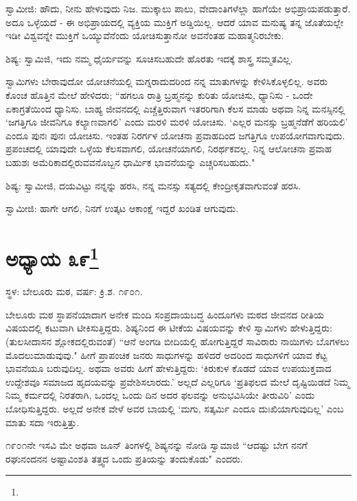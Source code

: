 ಸ್ವಾಮೀಜಿ: ಹೌದು, ನೀನು ಹೇಳುವುದು ನಿಜ. ಮುಕ್ಕಾಲು ಪಾಲು, ವೇದಾಂತಿಗಳೆಲ್ಲಾ ಹಾಗೆಯೇ ಅಭಿಪ್ರಾಯಪಡುತ್ತಾರೆ. ಅದೂ ಒಳ್ಳೆಯದೆ - ಈ ಅಭಿಪ್ರಾಯದಲ್ಲಿ ವ್ಯಕ್ತಿಯ ಮುಕ್ತಿಗೆ ಅಡ್ಡಿಯಿಲ್ಲ. ಆದರೆ ಯಾವ ಮನುಷ್ಯ ತನ್ನ ಜೊತೆಯಲ್ಲೇ ಇಡೀ ವಿಶ್ವವನ್ನೇ ಮುಕ್ತಿಗೆ ಒಯ್ಯುವೆನೆಂದು ಯೋಚಿಸುತ್ತಾನೋ ಅವನೆಂತಹ ಮಹಾತ್ಮನಿರಬೇಕು.

ಶಿಷ್ಯ: ಸ್ವಾಮಿಜಿ, ಇದು ನಮ್ಮ ಧೈರ್ಯವನ್ನು ಸೂಚಿಸಬಹುದೇ ಹೊರತು ಇದಕ್ಕೆ ಶಾಸ್ತ್ರ ಸಮ್ಮತವಿಲ್ಲ.

ಸ್ವಾಮಿಗಳು ಬೇರಾವುದೋ ಯೋಚನೆಯಲ್ಲಿ ಮಗ್ನರಾದುದರಿಂದ ನನ್ನ ಮಾತುಗಳನ್ನು ಕೇಳಿಸಿಕೊಳ್ಳಲಿಲ್ಲ. ಅವರು ಕೊಂಚ ಹೊತ್ತಿನ ಮೇಲೆ ಹೇಳಿದರು; “ಹಗಲೂ ರಾತ್ರಿ ಬ್ರಹ್ಮನನ್ನು ಕುರಿತು ಯೋಚಿಸು, ಧ್ಯಾನಿಸು - ಒಂದೇ ಏಕಾಗ್ರತೆಯಿಂದ ಧ್ಯಾನಿಸು. ಬಾಹ್ಯ ಜೀವನದಲ್ಲಿ ಎಚ್ಚೆತ್ತಿರುವಾಗ ಇತರರಿಗಾಗಿ ಕೆಲಸ ಮಾಡು ಅಥವಾ ನಿನ್ನ ಮನಸ್ಸಿನಲ್ಲಿ ‘ಜಗತ್ತಿಗೂ ಜೀವನಿಗೂ ಕಲ್ಯಾಣವಾಗಲಿ’ ಎಂದು ಮರಳಿ ಮರಳಿ ಯೋಚಿಸು. ‘ಎಲ್ಲರ ಮನಸ್ಸು ಬ್ರಹ್ಮನೆಡೆಗೆ ಹರಿಯಲಿ’ ಎಂದೂ ಪುನಃ ಪುನಃ ಯೋಚಿಸು. ಇಂತಹ ನಿರರ್ಗಳ ಯೋಚನಾ ಪ್ರವಾಹದಿಂದ ಜಗತ್ತಿಗೂ ಉಪಯೋಗವಾಗುವುದು. ಪ್ರಪಂಚದಲ್ಲಿ ಯಾವುದೇ ಒಳ್ಳೆಯ ಕೆಲಸವಾಗಲಿ, ಯೋಚನೆಯಾಗಲಿ, ನಿರರ್ಥಕವಲ್ಲ. ನಿನ್ನ ಆಲೋಚನಾ ಪ್ರವಾಹ ಬಹುಶಃ ಅಮೆರಿಕಾದಲ್ಲಿರುವವನೊಬ್ಬನ ಧಾರ್ಮಿಕ ಭಾವನೆಯನ್ನು ಎಚ್ಚರಿಸಬಹುದು."

ಶಿಷ್ಯ: ಸ್ವಾಮೀಜಿ, ದಯವಿಟ್ಟು ನನ್ನನ್ನು ಹರಸಿ, ನನ್ನ ಮನಸ್ಸು ಸತ್ಯದಲ್ಲಿ ಕೇಂದ್ರೀಕೃತವಾಗುವಂತೆ ಹರಸಿ.

ಸ್ವಾಮೀಜಿ: ಹಾಗೇ ಆಗಲಿ, ನಿನಗೆ ಉತ್ಕಟ ಆಕಾಂಕ್ಷೆ ಇದ್ದರೆ ಖಂಡಿತ ಆಗುವುದು.

\newpage

\chapter[ಅಧ್ಯಾಯ ೩೯]{ಅಧ್ಯಾಯ ೩೯\protect\footnote{}}

\begin{center}
ಸ್ಥಳ: ಬೇಲೂರು ಮಠ, ವರ್ಷ: ಕ್ರಿ.ಶ. ೧೯೦೧.
\end{center}

ಬೇಲೂರು ಮಠ ಸ್ಥಾಪನೆಯಾದಾಗ ಅನೇಕ ಮಂದಿ ಸಂಪ್ರದಾಯಬದ್ಧ ಹಿಂದೂಗಳು ಮಠದ ಜೀವನದ ರೀತಿಯ ವಿಷಯದಲ್ಲಿ ಕಟುವಾಗಿ ಟೀಕಿಸುತ್ತಿದ್ದರು. ಶಿಷ್ಯನಿಂದ ಈ ಟೀಕೆಯ ವಿಷಯವನ್ನು ಕೇಳಿ ಸ್ವಾಮಿಗಳು ಹೇಳುತ್ತಿದ್ದರು: (ತುಲಸೀದಾಸನ ಶ್ಲೋಕದಲ್ಲಿರುವಂತೆ) “ಆನೆ ಅಂಗಡಿ ಬೀದಿಯಲ್ಲಿ ಹೋಗುತ್ತಿದ್ದರೆ ಸಾವಿರಾರು ನಾಯಿಗಳು ಬೊಗಳಲು ಮೊದಲುಮಾಡುವುವು." ಹೀಗೆ ಪ್ರಾಪಂಚಿಕ ಜನರು ಸಾಧುಗಳನ್ನು ಹಳಿದರೆ ಅದರಿಂದ ಸಾಧುಗಳಿಗೆ ಯಾವ ಕೆಟ್ಟ ಭಾವನೆಯೂ ಬರುವುದಿಲ್ಲ. ಅಥವಾ ಅವರು ಹೀಗೆ ಹೇಳುತ್ತಿದ್ದರು: ‘ಕಿರುಕುಳ ಕೊಡದೆ ಯಾವ ಉಪಯುಕ್ತವಾದ ಉದ್ದೇಶವೂ ಸಮಾಜದ ಹೃದಯವನ್ನು ಪ್ರವೇಶಿಸಲಾರದು.’ ಅಲ್ಲದೆ ಎಲ್ಲರಿಗೂ ‘ಪ್ರತಿಫಲದ ಮೇಲೆ ದೃಷ್ಟಿಯಿಡದೆ ನಿಮ್ಮ ನಿಮ್ಮ ಕರ್ಮದಲ್ಲಿ ನಿರತರಾಗಿ, ಒಂದಲ್ಲ ಒಂದು ದಿನ ಅದರ ಫಲವನ್ನು ಅನುಭವಿಸಿಯೇ ತೀರುವಿರಿ’ ಎಂದು ಬೋಧಿಸುತ್ತಿದ್ದರು. ಅಲ್ಲದೆ ಅನೇಕ ವೇಳೆ ಅವರ ಬಾಯಲ್ಲಿ ‘ಮಗು, ಸತ್ಕರ್ಮಿ ಎಂದೂ ದುಃಖಿಯಾಗುವುದಿಲ್ಲ’ ಎಂಬ ಮಾತು ಸದಾ ಇರುತ್ತಿತ್ತು.

೧೯೦೧ನೇ ಇಸವಿ ಮೇ ಅಥವಾ ಜೂನ್ ತಿಂಗಳಲ್ಲಿ ಶಿಷ್ಯನನ್ನು ನೋಡಿ ಸ್ವಾಮಾಜಿ “ಆದಷ್ಟು ಬೇಗ ನನಗೆ ರಘುನಂದನನ ಅಷ್ಟಾವಿಂಶತಿ ತತ್ತ್ವದ ಒಂದು ಪ್ರತಿಯನ್ನು ತಂದುಕೊಡು" ಎಂದರು.

